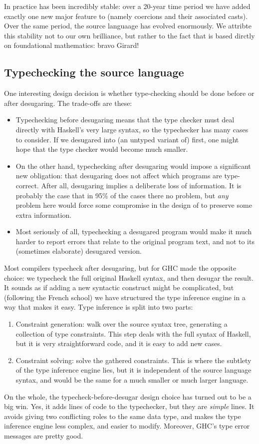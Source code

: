 \documentclass{article}
\begin{document}
In practice \Core{} has been incredibly stable: over a 20-year time period we have added exactly one new major feature to \Core{} (namely coercions and their associated casts).  Over the same period, the source languaage has evolved enormously.
We attribte this stability not to our own brilliance, but rather to the fact that \Core{} is based dirctly on foundational mathematics: bravo Girard!


\subsection{Typechecking the source language}

One interesting design decision is whether type-checking should be
done before or after desugaring.  The trade-offs are these:
\begin{itemize}
\item Typechecking before desugaring means that the type checker
must deal directly with Haskell's very large syntax, so the typechecker
has many cases to consider.  If we desugared into (an untyped variant of) \Core{} first, 
one might hope that the type checker would become much smaller.
\item On the other hand, typechecking after desugaring would impose a significant
new obligation: that desugaring does not affect which programs are type-correct.
After all, desugaring implies a deliberate loss of information.
It is probably the case that in 95\% of the cases there no problem, but
\emph{any} problem here would force some compromise in the design of \Core{} to
preserve some extra information. 
\item Most seriously of all, typechecking a desugared program would make it
much harder to report errors that relate to the original program text, and not
to its (sometimes elaborate) desugared version.
\end{itemize}
Most compilers typecheck after desugaring, but for GHC made the opposite choice:
we typecheck the full original Haskell syntax, and then desugar the result.
It sounds as if adding a new syntactic construct might be complicated, but
(following the French school) we have structured the type inference engine in
a way that makes it easy. Type inference is split into two parts: 
\begin{enumerate}
\item Constraint generation: walk over the source syntax tree, generating 
a collection of type constraints.  This step deals with the full syntax of Haskell,
but it is very straightforward code, and it is easy to add new cases.
\item Constraint solving: solve the gathered constraints.  This is where the
subtlety of the type inference engine lies, but it is independent of the source
language syntax, and would be the same for a much smaller or much larger language.
\end{enumerate}
On the whole, the typecheck-before-desugar design choice has turned
out to be a big win.  Yes, it adds lines of code to the typechecker,
but they are \emph{simple} lines. It avoids giving two conflicting
roles to the same data type, and makes the type inference engine
less complex, and easier to modify. Moreover, GHC's type error messages are
pretty good.
\end{document}
